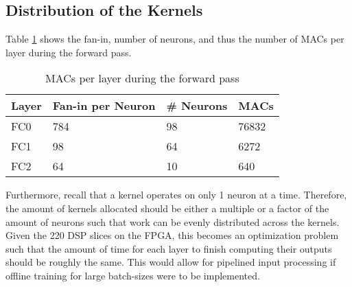 \subsection{Distribution of the Kernels}
Table \ref{macs-per-layer} shows the fan-in, number of neurons, and thus the number of MACs per layer during the forward pass. 
\begin{table}
	\centering
	\begin{tabular}{|l|l|l|l|}
		\hline
		Layer & Fan-in per Neuron & \# Neurons & MACs \\\hline 
		FC0 & 784  & 98 & 76832 \\\hline 
		FC1 & 98 & 64 & 6272 \\\hline 
		FC2 & 64 & 10 & 640 \\\hline
	\end{tabular}
	\caption{MACs per layer during the forward pass}
	\label{macs-per-layer}
\end{table}

Furthermore, recall that a kernel operates on only 1 neuron at a time. Therefore, the amount of kernels allocated should be either a multiple or a factor of the amount of neurons such that work can be evenly distributed across the kernels. Given the 220 DSP slices on the FPGA, this becomes an optimization problem such that the amount of time for each layer to finish computing their outputs should be roughly the same. This would allow for pipelined input processing if offline training for large batch-sizes were to be implemented.

